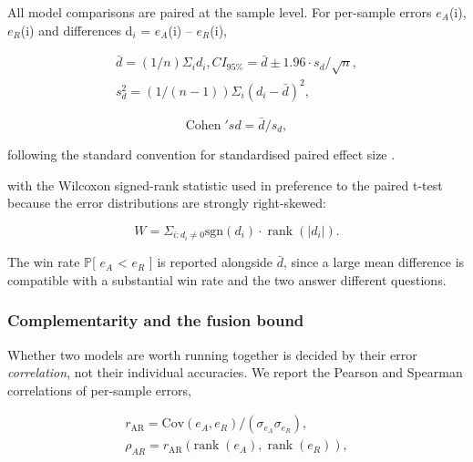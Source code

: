 All model comparisons are paired at the sample level. For per-sample errors $e_{A}$(i), $e_{R}$(i) and differences d$_{i}$ = $e_{A}$(i) -- $e_{R}$(i),

\begin{equation}
\label{eq:159}
\begin{aligned}
\bar{d} = (1/n) \Sigma _i d_{i} , CI_{95\%} = \bar{d} \pm 1.96 \cdot s_d / \sqrt{n} , \\
s_d^{2} = (1/(n-1)) \Sigma _i ( d_{i} - \bar{d} )^{2} ,
\end{aligned}
\end{equation}

\begin{equation}
\label{eq:160}
\text{Cohen}\;'s d = \bar{d} / s_d ,
\end{equation}

following the standard convention for standardised paired effect size .

with the Wilcoxon signed-rank statistic  used in preference to the paired t-test because the error distributions are strongly right-skewed:

\begin{equation}
\label{eq:161}
W = \Sigma _{i : d_{i} \neq 0} \mathrm{sgn}(d_{i}) \cdot \;\text{rank}\;( |d_{i}| ).
\end{equation}

The win rate $\mathbb{P}$[ $e_{A}$ < $e_{R}$ ] is reported alongside $\bar{d}$, since a large mean difference is compatible with a substantial win rate and the two answer different questions.

\subsubsection{Complementarity and the fusion bound}

Whether two models are worth running together is decided by their error \emph{correlation}, not their individual accuracies. We report the Pearson and Spearman correlations of per-sample errors,

\begin{equation}
\label{eq:162}
\begin{aligned}
r_{\mathrm{AR}} = \mathrm{Cov}( e_A, e_R ) / ( \sigma _{e_A} \sigma _{e_R} ) , \\
\rho _{AR} = r_{\mathrm{AR}}( \text{rank}\;(e_A), \;\text{rank}\;(e_R) ) ,
\end{aligned}
\end{equation}

